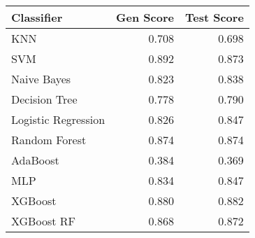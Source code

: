 \begin{tabular}{lrr}
\toprule
Classifier & Gen Score & Test Score \\
\midrule
KNN & 0.708 & 0.698 \\
SVM & 0.892 & 0.873 \\
Naive Bayes & 0.823 & 0.838 \\
Decision Tree & 0.778 & 0.790 \\
Logistic Regression & 0.826 & 0.847 \\
Random Forest & 0.874 & 0.874 \\
AdaBoost & 0.384 & 0.369 \\
MLP & 0.834 & 0.847 \\
XGBoost & 0.880 & 0.882 \\
XGBoost RF & 0.868 & 0.872 \\
\bottomrule
\end{tabular}
